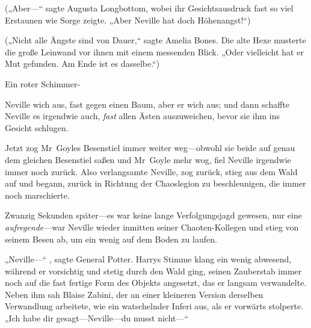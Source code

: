 („Aber—“ sagte Augusta Longbottom, wobei ihr Gesichtsausdruck fast so viel Erstaunen wie Sorge zeigte. „Aber Neville hat doch Höhenangst!“)

(„Nicht alle Ängste sind von Dauer,“ sagte Amelia Bones. Die alte Hexe musterte die große Leinwand vor ihnen mit einem messenden Blick. „Oder vielleicht hat er Mut gefunden. Am Ende ist es dasselbe.“)

Ein roter Schimmer-

Neville wich aus, fast gegen einen Baum, aber er wich aus; und dann schaffte Neville es irgendwie auch, \emph{fast} allen Ästen auszuweichen, bevor sie ihm ins Gesicht schlugen.

Jetzt zog Mr~Goyles Besenstiel immer weiter weg—obwohl sie beide auf genau dem gleichen Besenstiel saßen und Mr~Goyle mehr wog, fiel Neville irgendwie immer noch zurück. Also verlangsamte Neville, zog zurück, stieg aus dem Wald auf und begann, zurück in Richtung der Chaoslegion zu beschleunigen, die immer noch marschierte.

Zwanzig Sekunden später—es war keine lange Verfolgungsjagd gewesen, nur eine \emph{aufregende}—war Neville wieder inmitten seiner Chaoten-Kollegen und stieg von seinem Besen ab, um ein wenig auf dem Boden zu laufen.

„Neville—“ , sagte General Potter. Harrys Stimme klang ein wenig abwesend, während er vorsichtig und stetig durch den Wald ging, seinen Zauberstab immer noch auf die fast fertige Form des Objekts angesetzt, das er langsam verwandelte. Neben ihm sah Blaise Zabini, der an einer kleineren Version derselben Verwandlung arbeitete, wie ein watschelnder Inferi aus, als er vorwärts stolperte. „Ich habe dir gesagt—Neville—du musst nicht—“

